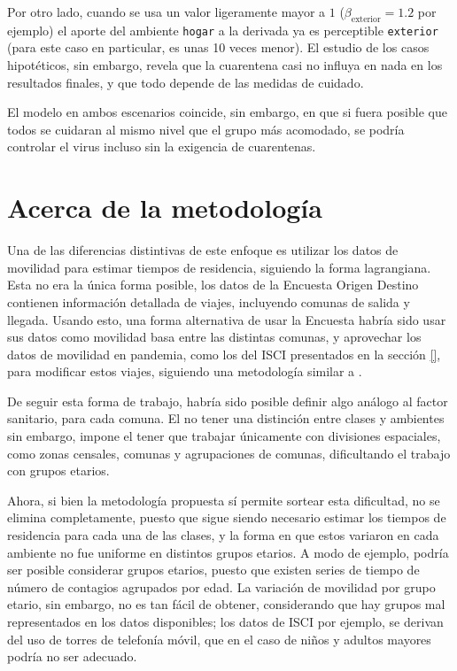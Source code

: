 Por otro lado, cuando se usa un valor ligeramente mayor a \(1\) (\(\beta_{\text{exterior}} = 1.2\) por ejemplo) el aporte del ambiente \texttt{hogar} a la derivada ya es perceptible \texttt{exterior} (para este caso en particular, es unas 10 veces menor). El estudio de los casos hipotéticos, sin embargo, revela que la cuarentena casi no influya en nada en los resultados finales, y que todo depende de las medidas de cuidado.

El modelo en ambos escenarios coincide, sin embargo, en que si fuera posible que todos se cuidaran al mismo nivel que el grupo más acomodado, se podría controlar el virus incluso sin la exigencia de cuarentenas.

\section{Acerca de la metodología}\label{dis:metod}

  



Una de las diferencias distintivas de este enfoque es utilizar los datos de movilidad para estimar tiempos de residencia, siguiendo la forma lagrangiana. Esta no era la única forma posible, los datos de la Encuesta Origen Destino contienen información detallada de viajes, incluyendo comunas de salida y llegada. Usando esto, una forma alternativa de usar la Encuesta habría sido usar sus datos como movilidad basa entre las distintas comunas, y aprovechar los datos de movilidad en pandemia, como los del ISCI presentados en la sección \ref{}, para modificar estos viajes, siguiendo una metodología similar a \cite{Lai2020}.


De seguir esta forma de trabajo, habría sido posible definir algo análogo al factor sanitario, para cada comuna. El no tener una distinción entre clases y ambientes sin embargo, impone el tener que trabajar únicamente con divisiones espaciales, como zonas censales, comunas y agrupaciones de comunas, dificultando el trabajo con grupos etarios.

Ahora, si bien la metodología propuesta sí permite sortear esta dificultad, no se elimina completamente, puesto que sigue siendo necesario estimar los tiempos de residencia para cada una de las clases, y la forma en que estos variaron en cada ambiente no fue uniforme en distintos grupos etarios. A modo de ejemplo, podría ser posible considerar grupos etarios, puesto que existen series de tiempo de número de contagios agrupados por edad. La variación de movilidad por grupo etario, sin embargo, no es tan fácil de obtener, considerando que hay grupos mal representados en los datos disponibles; los datos de ISCI por ejemplo, se derivan del uso de torres de telefonía móvil, que en el caso de niños y adultos mayores podría no ser adecuado.

